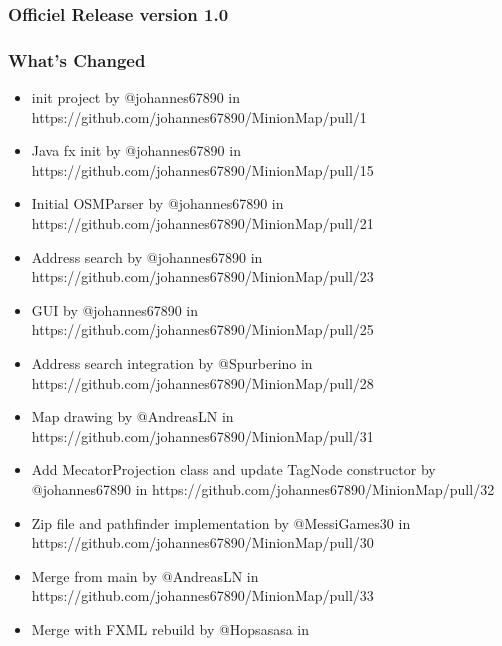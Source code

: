 \hypertarget{officiel-release-version-1.0}{%
\subsubsection*{Officiel Release version
1.0}\label{officiel-release-version-1.0}}

\hypertarget{whats-changed}{%
\subsubsection*{What's Changed}\label{whats-changed}}

\begin{itemize}
\tightlist
\item
  init project by @johannes67890 in\\
  https://github.com/johannes67890/MinionMap/pull/1
\item
  Java fx init by @johannes67890 in\\
  https://github.com/johannes67890/MinionMap/pull/15
\item
  Initial OSMParser by @johannes67890 in\\
  https://github.com/johannes67890/MinionMap/pull/21
\item
  Address search by @johannes67890 in\\
  https://github.com/johannes67890/MinionMap/pull/23
\item
  GUI by @johannes67890 in\\
  https://github.com/johannes67890/MinionMap/pull/25
\item
  Address search integration by @Spurberino in\\
  https://github.com/johannes67890/MinionMap/pull/28
\item
  Map drawing by @AndreasLN in\\
  https://github.com/johannes67890/MinionMap/pull/31
\item
  Add MecatorProjection class and update TagNode constructor by\\
  @johannes67890 in https://github.com/johannes67890/MinionMap/pull/32
\item
  Zip file and pathfinder implementation by @MessiGames30 in\\
  https://github.com/johannes67890/MinionMap/pull/30
\item
  Merge from main by @AndreasLN in\\
  https://github.com/johannes67890/MinionMap/pull/33
\item
  Merge with FXML rebuild by @Hopsasasa in\\

\end{itemize}
